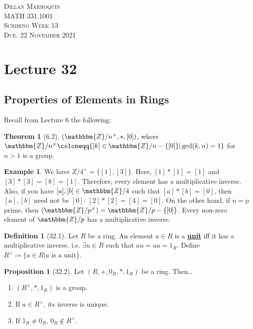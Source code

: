 \documentclass{article}
\newcommand{\Z}{\mathbbm{Z}}
\newcommand{\coleq}{\coloneqq}
\newcommand{\define}[1]{\textbf{\underline{#1}}}
\theoremstyle{definition}
\newtheorem*{defn}{Definition}
\newtheorem*{thm}{Theorem}
\newtheorem*{prop}{Proposition}
\newtheorem*{ex}{Example}
\theoremstyle{remark}
\begin{document}
    \begin{center}
        \textsc{Dillan Marroquin\\MATH 331.1001\\Scribing Week 13\\Due. 22 November 2021\\}
    \end{center}
        
    \section*{Lecture 32}{
        \subsection*{Properties of Elements in Rings}{
            Recall from Lecture 6 the following:
            \begin{thm}[6.2]
                $(\Z/n^\times,*,[0])$, where $\Z/n^\times \coleq \{[k] \in \Z/n-\{[0]\}|\gcd(k,n)=1\}$ for $n>1$ is a group.
            \end{thm}
            
            \begin{ex}
                We have $Z/4^\times=\{[1],[3]\}$. Here, $[1]*[1]=[1]$ and $[3]*[3]=[8]=[1]$. Therefore, every element has a multiplicative inverse. Also, if you have $[a],[b] \in \Z/4$ such that $[a]*[b]=[0]$, then $[a],[b]$ need not be $[0]$: $[2]*[2]=[4]=[0]$. On the other hand, if $n=p$ prime, then $(\Z/p^\times)=\Z/p-\{[0]\}$. Every non-zero element of $\Z/p$ has a multiplicative inverse.
            \end{ex}
            
            \begin{defn}[32.1]
                Let $R$ be a ring. An element $a \in R$ is a \define{unit} iff it has a multiplicative inverse. i.e. $\exists u \in R$ such that $au=ua=1_R$. Define $R^\times \coleq \{a \in R|a\text{ is a unit}\}$.
            \end{defn}
            
            \begin{prop}[32.2]
                Let $(R,+,0_R,*,1_R)$ be a ring. Then\ldots
                \begin{enumerate}
                    \item $(R^\times,*,1_R)$ is a group.
                    \item If $a \in R^\times$, its inverse is unique.
                    \item If $1_R \neq 0_R$, $0_R \notin R^\times$.
                \end{enumerate}
            \end{prop}
            
}}
\end{document}
